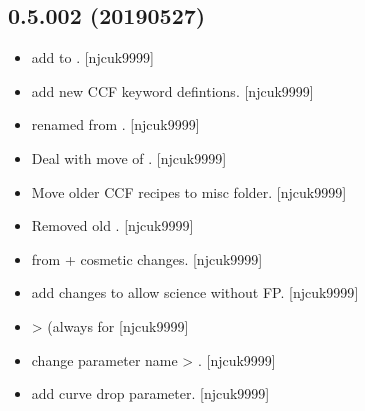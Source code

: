 \documentclass[a4paper,10pt,english]{report}
\begin{document}
\subsection{0.5.002 (2019\sphinxhyphen{}05\sphinxhyphen{}27)}
\label{\detokenize{misc/changelog:id153}}\begin{itemize}
\item {} 
 \sphinxhyphen{} add  to . {[}njcuk9999{]}

\item {} 
 \sphinxhyphen{} add new CCF keyword defintions. {[}njcuk9999{]}

\item {} 
 \sphinxhyphen{} renamed from .
{[}njcuk9999{]}

\item {} 
Deal with move of . {[}njcuk9999{]}

\item {} 
Move older CCF recipes to misc folder. {[}njcuk9999{]}

\item {} 
Removed old . {[}njcuk9999{]}

\item {} 
 \sphinxhyphen{} from  + cosmetic changes.
{[}njcuk9999{]}

\item {} 
 \sphinxhyphen{} add changes to allow science without FP.
{[}njcuk9999{]}

\item {} 
 \sphinxhyphen{}  \textendash{}\textgreater{}  (always
for  {[}njcuk9999{]}

\item {} 
 \sphinxhyphen{} change parameter name  \textendash{}\textgreater{}
. {[}njcuk9999{]}

\item {} 
 \sphinxhyphen{} add curve drop parameter. {[}njcuk9999{]}


\end{itemize}
\end{document}
